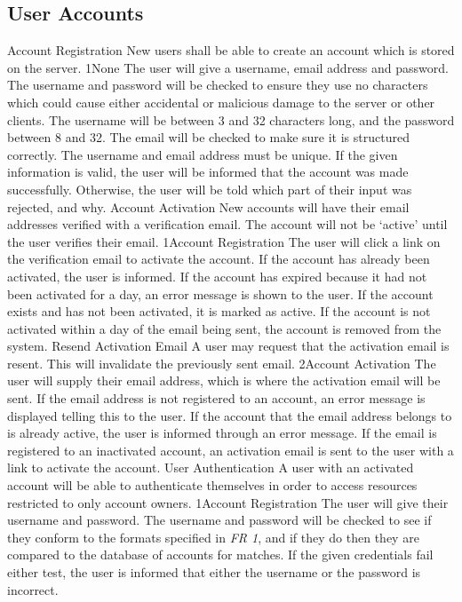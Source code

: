 	\subsection{User Accounts}
		\funcreq
			{Account Registration}
			{New users shall be able to create an account which is stored on the server.}
			{1}{None}
			{The user will give a username, email address and password.}
			{The username and password will be checked to ensure they use no characters which could cause either accidental or malicious damage to the server or other clients. The username will be between 3 and 32 characters long, and the password between 8 and 32. The email will be checked to make sure it is structured correctly. The username and email address must be unique.}
			{If the given information is valid, the user will be informed that the account was made successfully. Otherwise, the user will be told which part of their input was rejected, and why.}
		\funcreq
			{Account Activation}
			{New accounts will have their email addresses verified with a verification email. The account will not be `active' until the user verifies their email.}
			{1}{Account Registration}
			{The user will click a link on the verification email to activate the account.}
			{If the account has already been activated, the user is informed. If the account has expired because it had not been activated for a day, an error message is shown to the user.}
			{If the account exists and has not been activated, it is marked as active. If the account is not activated within a day of the email being sent, the account is removed from the system.}
		\funcreq
			{Resend Activation Email}
			{A user may request that the activation email is resent. This will invalidate the previously sent email.}
			{2}{Account Activation}
			{The user will supply their email address, which is where the activation email will be sent.}
			{If the email address is not registered to an account, an error message is displayed telling this to the user. If the account that the email address belongs to is already active, the user is informed through an error message.}
			{If the email is registered to an inactivated account, an activation email is sent to the user with a link to activate the account.}
		\funcreq
			{User Authentication}
			{A user with an activated account will be able to authenticate themselves in order to access resources restricted to only account owners.}
			{1}{Account Registration}
			{The user will give their username and password.}
			{The username and password will be checked to see if they conform to the formats specified in \emph{FR 1}, and if they do then they are compared to the database of accounts for matches. If the given credentials fail either test, the user is informed that either the username or the password is incorrect.}
